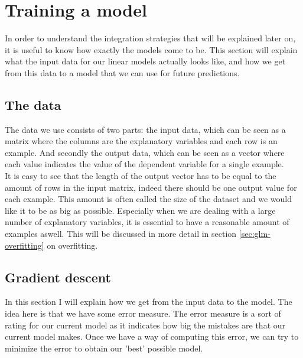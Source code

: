 \section{Training a model}
\label{sec:glm-trainingamodel}
In order to understand the integration strategies that will be explained later on, it is useful to know how exactly the models come to be. This section will explain what the input data for our linear models actually looks like, and how we get from this data to a model that we can use for future predictions.
\subsection{The data}

The data we use consists of two parts: the input data, which can be seen as a matrix where the columns are the explanatory variables and each row is an example. And secondly the output data, which can be seen as a vector where each value indicates the value of the dependent variable for a single example. \\
It is easy to see that the length of the output vector has to be equal to the amount of rows in the input matrix, indeed there should be one output value for each example. This amount is often called the size of the dataset and we would like it to be as big as possible. Especially when we are dealing with a large number of explanatory variables, it is essential to have a reasonable amount of examples aswell. This will be discussed in more detail in section \ref{sec:glm-overfitting} on overfitting. 

\subsection{Gradient descent}
In this section I will explain how we get from the input data to the model\cite{caltechmachinelearning}\cite{wikigd}\cite{gradientdescentvariants}. The idea here is that we have some error measure. The error measure is a sort of rating for our current model as it indicates how big the mistakes are that our current model makes. Once we have a way of computing this error, we can try to minimize the error to obtain our 'best' possible model.
